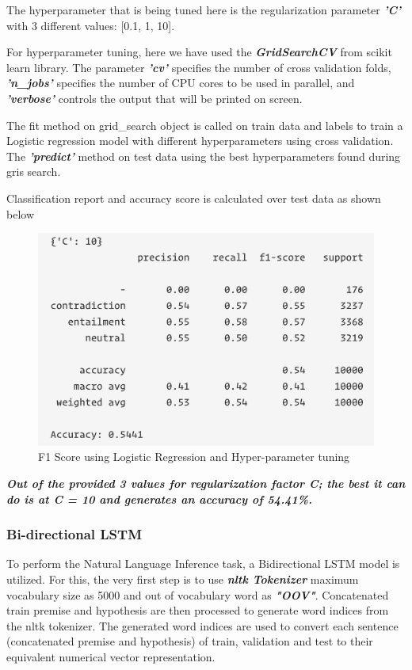 The hyperparameter that is being tuned here is the regularization parameter \textit{\textbf{'C'}} with 3 different values: [0.1, 1, 10].

For hyperparameter tuning, here we have used the \textit{\textbf{GridSearchCV}} from scikit learn library.  The parameter \textit{\textbf{'cv'}} specifies the number of cross validation folds, \textit{\textbf{'n\_jobs'}} specifies the number of CPU cores to be used in parallel, and \textit{\textbf{'verbose'}} controls the output that will be printed on screen.

The fit method on grid\_search object is called on train data and labels to train a Logistic regression model with different hyperparameters using cross validation. The \textit{\textbf{'predict'}} method on test data using the best hyperparameters found during gris search.

Classification report and accuracy score is calculated over test data as shown below

\begin{figure}[h]
	\centering
	\includegraphics[scale=0.7]{img/hyperlogicf1.png}
	\caption{F1 Score using Logistic Regression and Hyper-parameter tuning}
\end{figure}

\textit{\textbf{Out of the provided 3 values for regularization factor C; the best it can do is at C = 10 and generates an accuracy of 54.41\%.}}


\subsubsection{Bi-directional LSTM}

To perform the Natural Language Inference task, a Bidirectional LSTM model is utilized. For this, the very first step is to use \textit{\textbf{nltk Tokenizer}} maximum vocabulary size as 5000 and out of vocabulary word as \textit{\textbf{"OOV"}}.  Concatenated train premise and hypothesis are then processed to generate word indices from the nltk tokenizer.  The generated word indices are used to convert each sentence (concatenated premise and hypothesis) of train, validation and test to their equivalent numerical vector representation.

